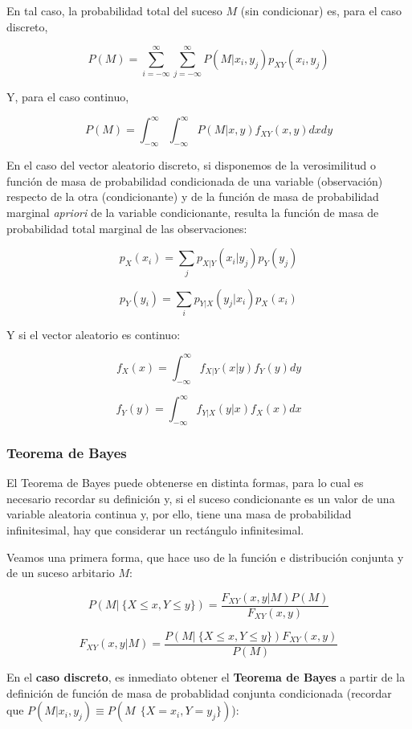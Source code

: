 \documentclass[11pt]{article}
\begin{document}
En tal caso, la probabilidad total del suceso \(M\) (sin condicionar)
es, para el caso discreto,

\[P(M) = \sum_{i=-\infty}^\infty\sum_{j=-\infty}^\infty P(M | x_i,y_j) p_{XY}(x_i,y_j)\]

Y, para el caso continuo,

\[P(M) = \int_{-\infty}^\infty\int_{-\infty}^\infty P(M | x,y) f_{XY}(x,y) dx dy\]

    En el caso del vector aleatorio discreto, si disponemos de la
verosimilitud o función de masa de probabilidad condicionada de una
variable (observación) respecto de la otra (condicionante) y de la
función de masa de probabilidad marginal \emph{apriori} de la variable
condicionante, resulta la función de masa de probabilidad total marginal
de las observaciones:

\[p_{X}(x_i) = \sum_j p_{X | Y}(x_i | y_j)p_{Y}(y_j)\]

\[p_{Y}(y_i) = \sum_i p_{Y | X}(y_j | x_i)p_{X}(x_i)\]

Y si el vector aleatorio es continuo:

\[f_{X}(x) = \int_{-\infty}^\infty f_{X | Y}(x | y)f_{Y}(y) dy\]

\[f_{Y}(y) = \int_{-\infty}^\infty f_{Y | X}(y | x)f_{X}(x) dx\]

    \hypertarget{teorema-de-bayes}{%
\subsubsection{Teorema de Bayes}\label{teorema-de-bayes}}

El Teorema de Bayes puede obtenerse en distinta formas, para lo cual es
necesario recordar su definición y, si el suceso condicionante es un
valor de una variable aleatoria continua y, por ello, tiene una masa de
probabilidad infinitesimal, hay que considerar un rectángulo
infinitesimal.

Veamos una primera forma, que hace uso de la función e distribución
conjunta y de un suceso arbitario \(M\):

\[P(M | \ \{X \leq x, Y \leq y\}) = \frac{F_{XY}(x,y | M)P(M)}{F_{XY}(x,y)}\]

\[F_{XY}(x,y | M) = \frac{P(M | \ \{X \leq x, Y \leq y\} )F_{XY}(x,y)}{P(M)}\]

    En el \textbf{caso discreto}, es inmediato obtener el \textbf{Teorema de
Bayes} a partir de la definición de función de masa de probablidad
conjunta condicionada (recordar que
\(P(M | x_i,y_j)\equiv P(M \ \ \{X=x_i,Y=y_j\})\)):
\end{document}
